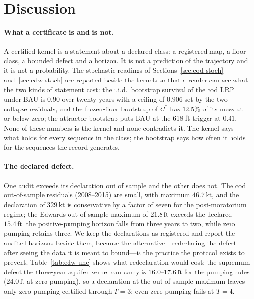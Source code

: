 \documentclass[11pt,a4paper]{article}
\theoremstyle{plain}
\theoremstyle{definition}
\theoremstyle{remark}
\newcommand{\Cstar}{C^{*}}
\newcommand{\kt}{\,\mathrm{kt}}
\newcommand{\ft}{\,\mathrm{ft}}
\begin{document}
\section{Discussion}\label{sec:discussion}

\paragraph{What a certificate is and is not.}
A certified kernel is a statement about a declared class: a registered map, a floor class, a bounded defect and a horizon. It is not a prediction of the trajectory and it is not a probability. The stochastic readings of Sections~\ref{sec:cod-stoch} and~\ref{sec:edw-stoch} are reported beside the kernels so that a reader can see what the two kinds of statement cost: the i.i.d.\ bootstrap survival of the cod LRP under BAU is $0.90$ over twenty years with a ceiling of $0.906$ set by the two collapse residuals, and the frozen-floor bootstrap of $\Cstar$ has $12.5\%$ of its mass at or below zero; the attractor bootstrap puts BAU at the 618-ft trigger at $0.41$. None of these numbers is the kernel and none contradicts it. The kernel says what holds for every sequence in the class; the bootstrap says how often it holds for the sequences the record generates.

\paragraph{The declared defect.}
One audit exceeds its declaration out of sample and the other does not. The cod out-of-sample residuals (2008--2015) are small, with maximum $46.7\kt$, and the declaration of $329\kt$ is conservative by a factor of seven for the post-moratorium regime; the Edwards out-of-sample maximum of $21.8\ft$ exceeds the declared $15.4\ft$; the positive-pumping horizon falls from three years to two, while zero pumping retains three. We keep the declarations as registered and report the audited horizons beside them, because the alternative---redeclaring the defect after seeing the data it is meant to bound---is the practice the protocol exists to prevent. Table~\ref{tab:edw-unc} shows what redeclaration would cost: the supremum defect the three-year aquifer kernel can carry is $16.0$--$17.6\ft$ for the pumping rules ($24.0\ft$ at zero pumping), so a declaration at the out-of-sample maximum leaves only zero pumping certified through $T=3$; even zero pumping fails at $T=4$.
\end{document}

